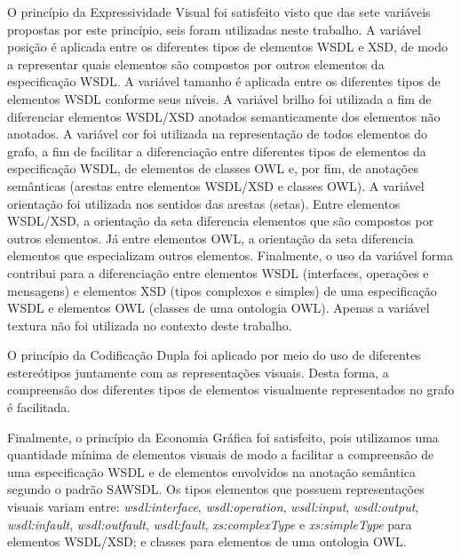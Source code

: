 O princípio da Expressividade Visual foi satisfeito visto que das sete variáveis propostas por este princípio, seis foram utilizadas neste trabalho. A variável posição é aplicada entre os diferentes tipos de elementos WSDL e XSD, de modo a representar quais elementos são compostos por outros elementos da especificação WSDL. A variável tamanho é aplicada entre os diferentes tipos de elementos WSDL conforme seus níveis. A variável brilho foi utilizada a fim de diferenciar elementos WSDL/XSD anotados semanticamente dos elementos não anotados. A variável cor foi utilizada na representação de todos elementos do grafo, a fim de facilitar a diferenciação entre diferentes tipos de elementos da especificação WSDL, de elementos de classes OWL e, por fim, de anotações semânticas (arestas entre elementos WSDL/XSD e classes OWL). A variável orientação foi utilizada nos sentidos das arestas (setas). Entre elementos WSDL/XSD, a orientação da seta diferencia elementos que são compostos por outros elementos. Já entre elementos OWL, a orientação da seta diferencia elementos que especializam outros elementos. Finalmente, o uso da variável forma contribui para a diferenciação entre elementos WSDL (interfaces, operações e mensagens) e elementos XSD (tipos complexos e simples) de uma especificação WSDL e elementos OWL (classes de uma ontologia OWL). Apenas a variável textura não foi utilizada no contexto deste trabalho.


O princípio da Codificação Dupla foi aplicado por meio do uso de diferentes estereótipos juntamente com as representações visuais. Desta forma, a compreensão dos diferentes tipos de elementos visualmente representados no grafo é facilitada.


Finalmente, o princípio da Economia Gráfica foi satisfeito, pois utilizamos uma quantidade mínima de elementos visuais de modo a facilitar a compreensão de uma especificação WSDL e de elementos envolvidos na anotação semântica segundo o padrão SAWSDL. Os tipos elementos que possuem representações visuais variam entre: \textit{wsdl:interface}, \textit{wsdl:operation}, \textit{wsdl:input}, \textit{wsdl:output}, \textit{wsdl:infault}, \textit{wsdl:outfault}, \textit{wsdl:fault}, \textit{xs:complexType} e \textit{xs:simpleType} para elementos WSDL/XSD; e classes para elementos de uma ontologia OWL.


